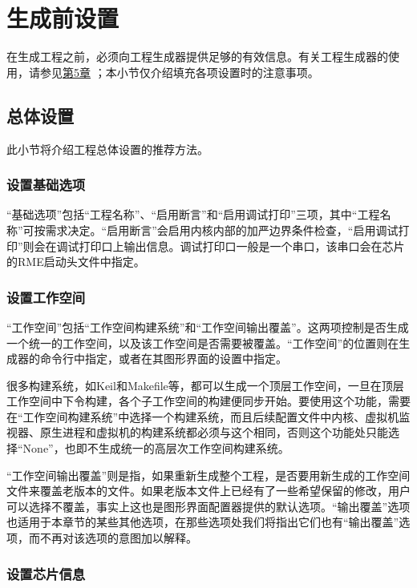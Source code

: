 \section{生成前设置}\label{sec:6-5}

在生成工程之前，必须向工程生成器提供足够的有效信息。有关工程生成器的使用，请参见\protect\hyperref[sec:5-1]{第5章}
；本小节仅介绍填充各项设置时的注意事项。

\subsection{总体设置}\label{subsec:6-5-1}

此小节将介绍工程总体设置的推荐方法。

\subsubsection{设置基础选项}\label{subsubsec:6-5-1-1}

``基础选项''包括``工程名称''、``启用断言''和``启用调试打印''三项，其中``工程名称''可按需求决定。``启用断言''会启用内核内部的加严边界条件检查，``启用调试打印''则会在调试打印口上输出信息。调试打印口一般是一个串口，该串口会在芯片的RME启动头文件中指定。

\subsubsection{设置工作空间}\label{subsubsec:6-5-1-2}

``工作空间''包括``工作空间构建系统''和``工作空间输出覆盖''。这两项控制是否生成一个统一的工作空间，以及该工作空间是否需要被覆盖。``工作空间''的位置则在生成器的命令行中指定，或者在其图形界面的设置中指定。

很多构建系统，如Keil和Makefile等，都可以生成一个顶层工作空间，一旦在顶层工作空间中下令构建，各个子工作空间的构建便同步开始。要使用这个功能，需要在``工作空间构建系统''中选择一个构建系统，而且后续配置文件中内核、虚拟机监视器、原生进程和虚拟机的构建系统都必须与这个相同，否则这个功能处只能选择``None''，也即不生成统一的高层次工作空间构建系统。

``工作空间输出覆盖''则是指，如果重新生成整个工程，是否要用新生成的工作空间文件来覆盖老版本的文件。如果老版本文件上已经有了一些希望保留的修改，用户可以选择不覆盖，事实上这也是图形界面配置器提供的默认选项。``输出覆盖''选项也适用于本章节的某些其他选项，在那些选项处我们将指出它们也有``输出覆盖''选项，而不再对该选项的意图加以解释。

\subsubsection{设置芯片信息}\label{subsubsec:6-5-1-3}

